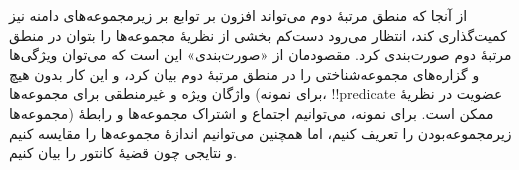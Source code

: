 \documentclass[../../../include/open-logic-section]{subfiles}
\begin{document}


از آنجا که منطق مرتبهٔ دوم می‌تواند افزون بر توابع بر زیرمجموعه‌های
دامنه نیز کمیت‌گذاری کند، انتظار می‌رود دست‌کم بخشی از نظریهٔ مجموعه‌ها
را بتوان در منطق مرتبهٔ دوم صورت‌بندی کرد. مقصودمان از «صورت‌بندی» این
است که می‌توان ویژگی‌ها و گزاره‌های مجموعه‌شناختی را در منطق مرتبهٔ دوم
بیان کرد، و این کار بدون هیچ واژگان ویژه و غیرمنطقی برای مجموعه‌ها
(برای نمونه، !!{predicate} عضویت در نظریهٔ مجموعه‌ها) ممکن است. برای
نمونه، می‌توانیم اجتماع و اشتراک مجموعه‌ها و رابطهٔ زیرمجموعه‌بودن را
تعریف کنیم، اما همچنین می‌توانیم اندازهٔ مجموعه‌ها را مقایسه کنیم و
نتایجی چون قضیهٔ کانتور را بیان کنیم.
\end{document}
